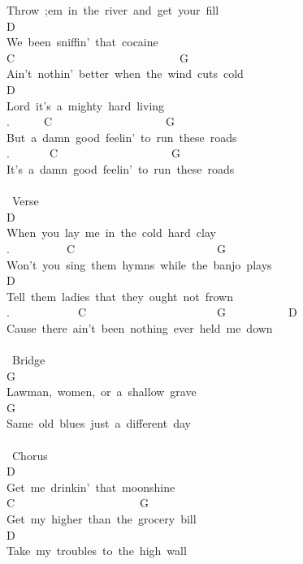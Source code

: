 {Throw\ ;em\ in\ the\ river\ and\ get\ your\ fill\\
D\\
We\ been\ sniffin'\ that\ cocaine\\
C\ \ \ \ \ \ \ \ \ \ \ \ \ \ \ \ \ \ \ \ \ \ \ \ \ \ \ \ \ G\\
Ain't\ nothin'\ better\ when\ the\ wind\ cuts\ cold\\
D\\
Lord\ it's\ a\ mighty\ hard\ living\ \\
.\ \ \ \ \ \ C\ \ \ \ \ \ \ \ \ \ \ \ \ \ \ \ \ \ \ \ G\\
But\ a\ damn\ good\ feelin'\ to\ run\ these\ roads\\
.\ \ \ \ \ \ \ C\ \ \ \ \ \ \ \ \ \ \ \ \ \ \ \ \ \ \ \ G\\
It's\ a\ damn\ good\ feelin'\ to\ run\ these\ roads\\
\\
\lbrack\ Verse\rbrack\\
D\\
When\ you\ lay\ me\ in\ the\ cold\ hard\ clay\\
.\ \ \ \ \ \ \ \ \ \ C\ \ \ \ \ \ \ \ \ \ \ \ \ \ \ \ \ \ \ \ \ \ \ \ \ G\\
Won't\ you\ sing\ them\ hymns\ while\ the\ banjo\ plays\\
D\\
Tell\ them\ ladies\ that\ they\ ought\ not\ frown\\
.\ \ \ \ \ \ \ \ \ \ \ \ C\ \ \ \ \ \ \ \ \ \ \ \ \ \ \ \ \ \ \ \ \ \ \ G\ \ \ \ \ \ \ \ \ \ \ D\\
Cause\ there\ ain't\ been\ nothing\ ever\ held\ me\ down\\
\\
\lbrack\ Bridge\rbrack\\
G\\
Lawman,\ women,\ or\ a\ shallow\ grave\\
G\\
Same\ old\ blues\ just\ a\ different\ day\\
\\
\lbrack\ Chorus\rbrack\\
D\\
Get\ me\ drinkin'\ that\ moonshine\\
C\ \ \ \ \ \ \ \ \ \ \ \ \ \ \ \ \ \ \ \ \ \ G\\
Get\ my\ higher\ than\ the\ grocery\ bill\\
D\\
Take\ my\ troubles\ to\ the\ high\ wall\\
}
